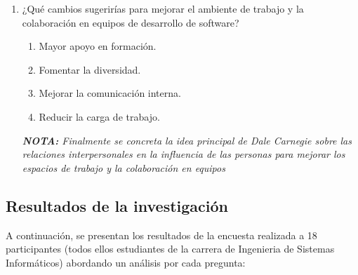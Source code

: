 \documentclass[journal]{IEEEtran}
\begin{document}
\begin{enumerate}
	\item ¿Qué cambios sugerirías para mejorar el ambiente de trabajo y la colaboración en equipos de desarrollo de software?
	\begin{enumerate}
		\item Mayor apoyo en formación.
		\item Fomentar la diversidad.
		\item Mejorar la comunicación interna.
		\item Reducir la carga de trabajo.
	\end{enumerate}
	\textit{\textbf{NOTA:} Finalmente se concreta la idea principal de Dale Carnegie sobre las relaciones interpersonales en la influencia de las personas para mejorar los espacios de trabajo y la colaboración en equipos}
\end{enumerate}

\newpage

\subsection{Resultados de la investigación}
A continuación, se presentan los resultados de la encuesta realizada a 18 participantes (todos ellos estudiantes de la carrera de Ingenieria de Sistemas Informáticos) abordando un análisis por cada pregunta:
\end{document}
